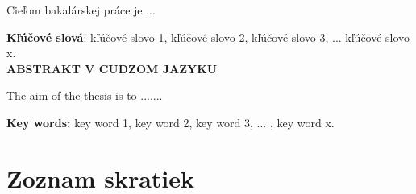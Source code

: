 \bigskip
Cieľom bakalárskej práce je ...


\bigskip
\noindent
\textbf{Kľúčové slová}:  kľúčové slovo 1, kľúčové slovo 2, kľúčové slovo 3, ... kľúčové slovo x.
\bigskip
\\

\bigskip
\noindent\textbf{ABSTRAKT V CUDZOM JAZYKU }

\bigskip
The aim of the thesis is to .......

\bigskip
\noindent
\textbf{Key words: } key word 1, key word 2, key word 3, ... , key word x.
\clearpage


\setcounter{tocdepth}{1}
\tableofcontents
\cleardoublepage
\clearpage

\newpage
\cleardoublepage
\listoffigures
{}
\listoftables
{}
\cleardoublepage
\clearpage

\pagestyle{plain}
\vspace{0pt plus 2cm}
\chapter*{Zoznam skratiek}
\begin{acronym}
\end{acronym}

